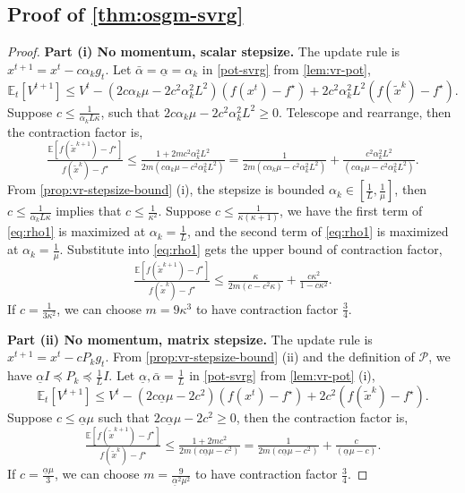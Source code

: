 \documentclass{article}
\theoremstyle{definition}
\begin{document}
\subsection{Proof of \cref{thm:osgm-svrg}}
\begin{proof}
  \textbf{Part (i) No momentum, scalar stepsize.} The update rule is $x^{t +
  1} = x^t - c \alpha_k g_t$. Let $\bar{\alpha} = \underline{\alpha} =
  \alpha_k$ in \eqref{pot-svrg} from \cref{lem:vr-pot},
  \[ \mathbb{E}_t [V^{t + 1}] \leq V^t - (2 c \alpha_k \mu - 2 c^2 \alpha_k^2
     L^2) (f (x^t) - f^{\star}) + 2 c^2 \alpha_k^2 L^2 (f (\tilde{x}^k) -
     f^{\star}) . \]
  Suppose $c \leq \tfrac{1}{\alpha_k L \kappa}$, such that $2 c \alpha_k \mu -
  2 c^2 \alpha_k^2 L^2 \geq 0$. Telescope and rearrange, then the contraction
  factor is,
  \begin{equation}\label{eq:rho1}
    \tfrac{\mathbb{E} [f (\tilde{x}^{k + 1}) - f^{\star}]}{f (\tilde{x}^k) -
    f^{\star}} \leq \tfrac{1 + 2 m c^2 \alpha_k^2 L^2}{2 m (c \alpha_k \mu -
    c^2 \alpha_k^2 L^2)} = \tfrac{1}{2 m (c \alpha_k \mu - c^2 \alpha_k^2
    L^2)} + \tfrac{c^2 \alpha_k^2 L^2}{(c \alpha_k \mu - c^2 \alpha_k^2 L^2)}
    . 
  \end{equation}
  From \cref{prop:vr-stepsize-bound} (i), the stepsize is bounded $\alpha_k \in \left[ \tfrac{1}{L},
  \tfrac{1}{\mu} \right]$, then $c \leq \tfrac{1}{\alpha_k L \kappa}$ implies
  that $c \leq \tfrac{1}{\kappa^2}$. Suppose $c \leq \tfrac{1}{\kappa (\kappa
  + 1)}$, we have the first term of \eqref{eq:rho1} is maximized at $\alpha_k
  = \tfrac{1}{L}$, and the second term of \eqref{eq:rho1} is maximized at
  $\alpha_k = \tfrac{1}{\mu}$. Substitute into \eqref{eq:rho1} gets the upper
  bound of contraction factor,
  \[ \tfrac{\mathbb{E} [f (\tilde{x}^{k + 1}) - f^{\star}]}{f (\tilde{x}^k) -
     f^{\star}} \leq \tfrac{\kappa}{2 m (c - c^2 \kappa)} + \tfrac{c
     \kappa^2}{1 - c \kappa^2} . \]
  If $c = \tfrac{1}{3 \kappa^2}$, we can choose $m = 9 \kappa^3$ to have
  contraction factor $\tfrac{3}{4}$.
  
  \textbf{Part (ii) No momentum, matrix stepsize.} The update rule is $x^{t +
  1} = x^t - c P_k g_t$. From \cref{prop:vr-stepsize-bound} (ii) and the definition of $\mathcal{P}$, we have
  $\underline{\alpha} I \preceq P_k \preceq \tfrac{1}{L} I$. Let
  $\underline{\alpha}, \bar{\alpha} = \tfrac{1}{L}$ in \eqref{pot-svrg} from \cref{lem:vr-pot} (i),
  \[ \mathbb{E}_t [V^{t + 1}] \leq V^t - \left( 2 c \underline{\alpha}
     \mu - 2 c^2 \right) (f (x^t) - f^{\star}) + 2 c^2 (f (\tilde{x}^k) -
     f^{\star}) . \]
  Suppose $c \leq \underline{\alpha} \mu$ such that $2 c \underline{\alpha}
  \mu - 2 c^2 \geq 0$, then the contraction factor is,
  \[ \tfrac{\mathbb{E} [f (\tilde{x}^{k + 1}) - f^{\star}]}{f (\tilde{x}^k) -
     f^{\star}} \leq \tfrac{1 + 2 m c^2}{2 m \left( c \underline{\alpha} \mu -
     c^2 \right)} = \tfrac{1}{2 m \left( c \underline{\alpha} \mu - c^2
     \right)} + \tfrac{c}{\left( \underline{\alpha} \mu - c \right)} . \]
  If $c = \tfrac{\underline{\alpha} \mu}{3}$, we can choose $m =
  \tfrac{9}{\underline{\alpha}^2 \mu^2}$ to have contraction factor
  $\tfrac{3}{4}$.
  

\end{proof}
\end{document}
